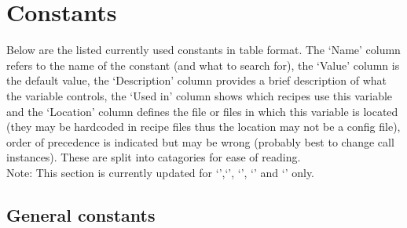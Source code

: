 \section{Constants}
\label{section:the_constants}





%
%


Below are the listed currently used constants in table format. The `Name' column refers to the name of the constant (and what to search for), the `Value' column is the default value, the `Description' column provides a brief description of what the variable controls, the `Used in' column shows which recipes use this variable and the `Location' column defines the file or files in which this variable is located (they may be hardcoded in recipe files thus the location may not be a config file), order of precedence is indicated but may be wrong (probably best to change call instances). These are split into catagories for ease of reading. \\

\noindent Note: This section is currently updated for `\caldark',`\calloc', `\calslit', `\calff' and `\caldrift' only.

\vspace{0.5cm}
\subsection{General constants}

